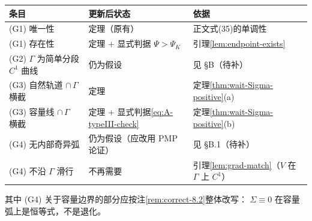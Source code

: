 \begin{center}
\begin{tabular}{@{}lll@{}}
\hline
条目 & 更新后状态 & 依据\\
\hline
(G1) 唯一性 & 定理（原有） & 正文式(35)的单调性\\
(G1) 存在性 & 定理 $+$ 显式判据 $\Psi>\Psi_K$ & 引理\ref{lem:endpoint-exists}\\
(G2) $\Gamma$ 为简单分段 $C^1$ 曲线 & 仍为假设 & 见 \S B（待补）\\
(G3) 自然轨道 $\cap\,\Gamma$ 横截 & 定理 & 定理\ref{thm:wait-Sigma-positive}(a)\\
(G3) 容量线 $\cap\,\Gamma$ 横截 & 定理 $+$ 显式判据\eqref{eq:A-typeIII-check} & 定理\ref{thm:wait-Sigma-positive}(b)\\
(G4) 无内部奇异弧 & 仍为假设（应改用 PMP 论证） & 见 \S B.1（待补）\\
(G4) 不沿 $\Gamma$ 滑行 & 不再需要 & 引理\ref{lem:grad-match}（$V$ 在 $\Gamma$ 上 $C^1$）\\
\hline
\end{tabular}
\end{center}

其中 (G4) 关于容量边界的部分应按注\ref{rem:correct-8.2}整体改写：
$\Sigma\equiv0$ 在容量弧上是恒等式，不是退化。

